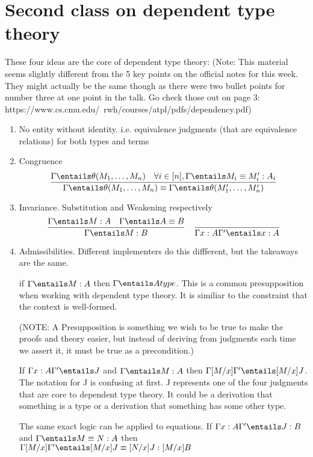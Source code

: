 \documentclass[11pt]{article}
\begin{document}
\section*{Second class on dependent type theory}
These four ideas are the core of dependent type theory: (Note: This material seems slightly different from the 5 key points on the official notes for this week. They might actually be the same though as there were two bullet points for number three at one point in the talk. Go check those out on page 3: https://www.cs.cmu.edu/~rwh/courses/atpl/pdfs/dependency.pdf)
\begin{enumerate}
    \item No entity without identity. i.e. equivalence judgments (that are equivalence relations) for both types and terms
    \item Congruence
    \[
    \frac{\Gamma \entails \theta(M_1, \dots, M_n) \quad \forall i \in [n], \Gamma \entails M_i \equiv M'_i : A_i}{\Gamma \entails \theta(M_1, \dots, M_n) \equiv \Gamma \entails \theta(M'_1, \dots, M'_n) }
    \]
    \item Invariance. Substitution and Weakening respectively
    \[
        \frac{\Gamma \entails M : A \quad \Gamma \entails A \equiv B}{\Gamma \entails M : B} \quad \frac{}{\Gamma x : A \Gamma' \entails x : A}
    \]
    \item Admissibilities. Different implementers do this diffferent, but the takeaways are the same.

    if $\Gamma \entails M : A$ then $\Gamma \entails A type$. This is a common presupposition when working with dependent type theory. It is similiar to the constraint that the context is well-formed.

    (NOTE: A Presupposition is something we wish to be true to make the proofs and theory easier, but instead of deriving from judgments each time we assert it, it must be true as a precondition.)

    If $\Gamma x : A \Gamma' \entails J$ and $\Gamma \entails M : A$ then $\Gamma [M / x] \Gamma' \entails [M/x]J$. The notation for J is confusing at first. J represents one of the four judgments that are core to dependent type theory. It could be a derivation that something is a type or a derivation that something has some other type.

    The same exact logic can be applied to equations. If $\Gamma x : A \Gamma' \entails J : B$ and $\Gamma \entails M \equiv N : A$ then $\Gamma [M / x] \Gamma' \entails [M / x] J \equiv [N / x] J: [M/x]B$

\end{enumerate}
\end{document}
